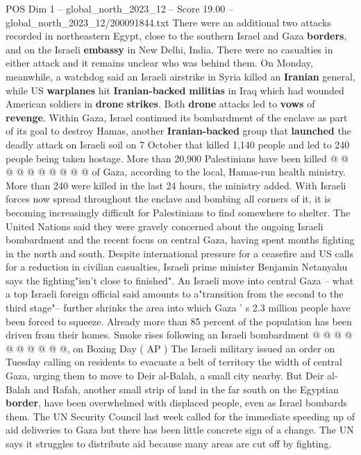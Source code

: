\begin{textsample}{POS Dim 1 – global\_north\_2023\_12 – Score 19.00 – global\_north\_2023\_12/200091844.txt}
There were an additional two attacks recorded in northeastern Egypt, close to the southern Israel and Gaza \textbf{borders}, and on the Israeli \textbf{embassy} in New Delhi, India.
There were no casualties in either attack and it remains unclear who was behind them.
On Monday, meanwhile, a watchdog said an Israeli airstrike in Syria killed an \textbf{Iranian} general, while US \textbf{warplanes} hit \textbf{Iranian-backed} \textbf{militias} in Iraq which had wounded American soldiers in \textbf{drone} \textbf{strikes}.
Both \textbf{drone} attacks led to \textbf{vows} of \textbf{revenge}.
Within Gaza, Israel continued its bombardment of the enclave as part of its goal to destroy Hamas, another \textbf{Iranian-backed} group that \textbf{launched} the deadly attack on Israeli soil on 7 October that killed 1,140 people and led to 240 people being taken hostage.
More than 20,900 Palestinians have been killed @ @ @ @ @ @ @ @ @ @ of Gaza, according to the local, Hamas-run health ministry.
More than 240 were killed in the last 24 hours, the ministry added.
With Israeli forces now spread throughout the enclave and bombing all corners of it, it is becoming increasingly difficult for Palestinians to find somewhere to shelter.
The United Nations said they were gravely concerned about the ongoing Israeli bombardment and the recent focus on central Gaza, having spent months fighting in the north and south.
Despite international pressure for a ceasefire and US calls for a reduction in civilian casualties, Israeli prime minister Benjamin Netanyahu says the fighting"isn't close to finished".
An Israeli move into central Gaza -- what a top Israeli foreign official said amounts to a"transition from the second to the third stage"-- further shrinks the area into which Gaza ' s 2.3 million people have been forced to squeeze.
Already more than 85 percent of the population has been driven from their homes.
Smoke rises following an Israeli bombardment @ @ @ @ @ @ @ @ @ @, on Boxing Day ( AP ) The Israeli military issued an order on Tuesday calling on residents to evacuate a belt of territory the width of central Gaza, urging them to move to Deir al-Balah, a small city nearby.
But Deir al-Balah and Rafah, another small strip of land in the far south on the Egyptian \textbf{border}, have been overwhelmed with displaced people, even as Israel bombards them.
The UN Security Council last week called for the immediate speeding up of aid deliveries to Gaza but there has been little concrete sign of a change.
The UN says it struggles to distribute aid because many areas are cut off by fighting.

\end{textsample}
